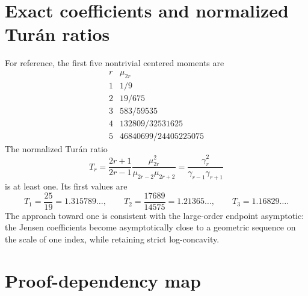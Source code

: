 \documentclass[11pt,oneside]{article}
\theoremstyle{definition}
\theoremstyle{remark}
\begin{document}
\appendix

\section{Exact coefficients and normalized Tur\'an ratios}

For reference, the first five nontrivial centered moments are
\begin{equation}\label{eq:moment-table-display}
\begin{array}{c|c}
 r&\mu_{2r}\\
\hline
1&1/9\\
2&19/675\\
3&583/59535\\
4&132809/32531625\\
5&46840699/24405225075
\end{array}
\end{equation}
The normalized Tur\'an ratio
\begin{equation}\label{eq:Turan-ratio}
 T_r=\frac{2r+1}{2r-1}
 \frac{\mu_{2r}^2}{\mu_{2r-2}\mu_{2r+2}}
 =\frac{\gamma_r^2}{\gamma_{r-1}\gamma_{r+1}}
\end{equation}
is at least one.  Its first values are
\begin{equation}\label{eq:Turan-values}
 T_1=\frac{25}{19}=1.315789\ldots,
 \qquad
 T_2=\frac{17689}{14575}=1.21365\ldots,
 \qquad
 T_3=1.16829\ldots.
\end{equation}
The approach toward one is consistent with the large-order endpoint
asymptotic: the Jensen coefficients become asymptotically close to a geometric
sequence on the scale of one index, while retaining strict log-concavity.

\section{Proof-dependency map}
\end{document}
